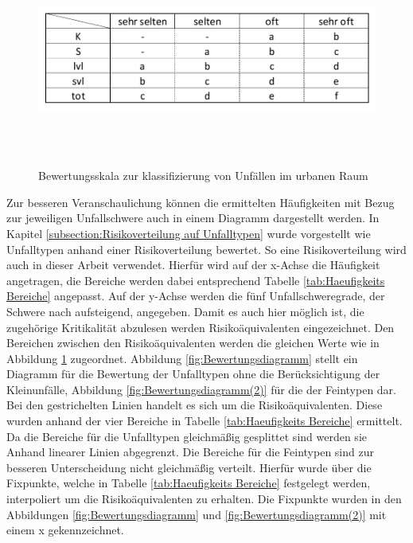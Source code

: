 \begin{savenotes}
	\begin{figure}[H]
		\centering
		\includegraphics[width=12cm,height=7cm]{figures/Bewertungsskala}
		\caption[Bewertungsskala zur klassifizierung von Unfällen im urbanen Raum]{Bewertungsskala zur klassifizierung von Unfällen im urbanen Raum}\label{fig:Bewertungsskala}
	\end{figure}
\end{savenotes}

Zur besseren Veranschaulichung können die ermittelten Häufigkeiten mit Bezug zur jeweiligen Unfallschwere auch in einem Diagramm dargestellt werden. In Kapitel \ref{subsection:Risikoverteilung auf Unfalltypen} wurde vorgestellt wie \Textcite[S. 60]{Gschwendtner.2015} Unfalltypen anhand einer Risikoverteilung bewertet. So eine Risikoverteilung wird auch in dieser Arbeit verwendet. Hierfür wird auf der x-Achse die Häufigkeit angetragen, die Bereiche werden dabei entsprechend Tabelle \ref{tab:Haeufigkeits Bereiche} angepasst. Auf der y-Achse werden die fünf Unfallschweregrade, der Schwere nach aufsteigend, angegeben. Damit es auch hier möglich ist, die zugehörige Kritikalität abzulesen werden Risikoäquivalenten eingezeichnet. Den Bereichen zwischen den Risikoäquivalenten werden die gleichen Werte wie in Abbildung \ref{fig:Bewertungsskala} zugeordnet. Abbildung \ref{fig:Bewertungsdiagramm} stellt ein Diagramm für die Bewertung der Unfalltypen ohne die Berücksichtigung der Kleinunfälle, Abbildung \ref{fig:Bewertungsdiagramm(2)} für die der Feintypen dar. Bei den gestrichelten Linien handelt es sich um die Risikoäquivalenten. Diese wurden anhand der vier Bereiche in Tabelle \ref{tab:Haeufigkeits Bereiche} ermittelt. Da die Bereiche für die Unfalltypen gleichmäßig gesplittet sind werden sie Anhand linearer Linien abgegrenzt. Die Bereiche für die Feintypen sind zur besseren Unterscheidung nicht gleichmäßig verteilt. Hierfür wurde über die Fixpunkte, welche in Tabelle \ref{tab:Haeufigkeits Bereiche} festgelegt werden, interpoliert um die Risikoäquivalenten zu erhalten. Die Fixpunkte wurden in den Abbildungen \ref{fig:Bewertungsdiagramm} und \ref{fig:Bewertungsdiagramm(2)} mit einem x gekennzeichnet. 

